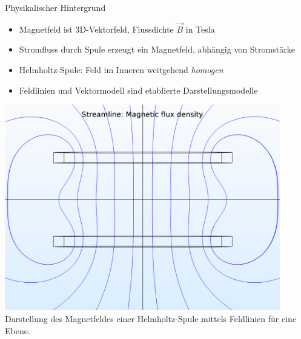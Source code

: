 \begin{frame}[fragile]{Physikalischer Hintergrund}
\begin{minipage}{0.5\textwidth}
	{
		\begin{itemize}[itemsep=1mm]
			\item Magnetfeld ist 3D-Vektorfeld, Flussdichte $\vec{B}$ in Tesla
			\item Stromfluss durch Spule erzeugt ein Magnetfeld, abhängig von Stromstärke
			\item Helmholtz-Spule: Feld im Inneren weitgehend \textit{homogen}
			\item Feldlinien und Vektormodell sind etablierte Darstellungsmodelle
		\end{itemize}
	}
\end{minipage}
\pause
\begin{minipage}{0.45\textwidth}
	\centering
	\includegraphics[width=0.9\textwidth]{images/papers/hh_mfield_nocol.png}\\
	\small Darstellung des Magnetfeldes einer Helmholtz-Spule mittels Feldlinien für eine Ebene.
\end{minipage}
\end{frame}
